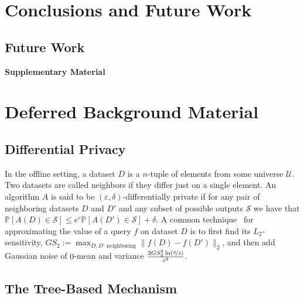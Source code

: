 \documentclass{article}
\renewcommand{\Pr}{\mathds{P}}
\begin{document}
\section{Conclusions and Future Work}
\label{sec:conclusions}

\subsection{Future Work}
\label{sec:future-work}







\cleardoublepage
\appendix
{}
{}
\begin{center}
  \LARGE\bf Supplementary Material
\end{center}


\section{Deferred Background Material}
\label{apx_sec:more_background}

\subsection{Differential Privacy}
\label{apx_subsec:DP}

In the offline setting, a dataset $D$ is a $n$-tuple of elements from some universe $\mathcal{U}$. Two datasets are called neighbors if they differ just on a single element. An algorithm $A$ is said to be $(\varepsilon,\delta)$-differentially private if for any pair of neighboring datasets $D$ and $D'$ and any subset of possible outputs $\mathcal{S}$ we have that $\Pr[A(D)\in\mathcal{S}]\leq e^\varepsilon\Pr[A(D')\in\mathcal{S}] + \delta$. A common technique~\cite{DWorkKentrapadi...2006} for approximating the value of a query $f$ on dataset $D$ is to first find its $L_2$-sensitivity, $GS_2 :=\max_{D,D'\textrm{ neighboring}} \|f(D)-f(D')\|_2$, and then add Gaussian noise of $0$-mean and variance $\tfrac{2GS_2^2\ln(\nicefrac 2 \delta)}{\varepsilon^2}$.

\subsection{The Tree-Based Mechanism}
\end{document}
